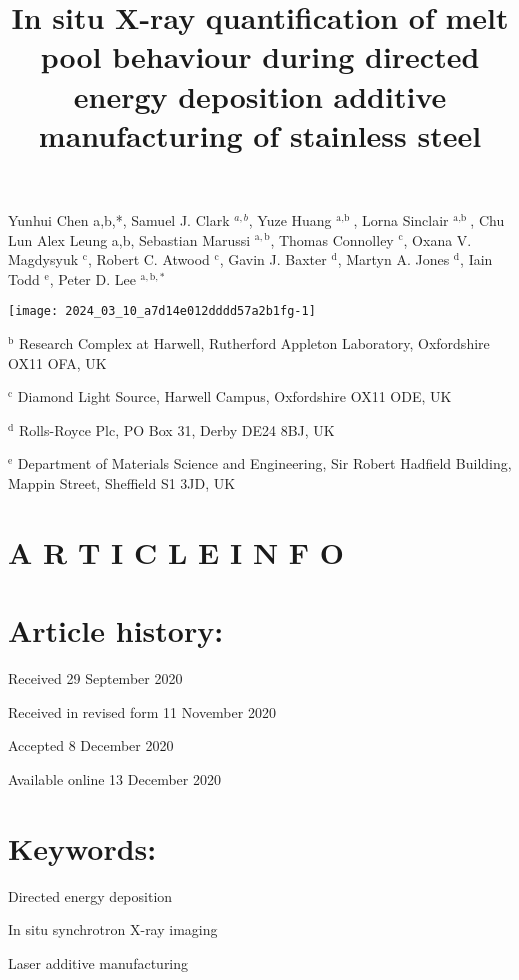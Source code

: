 \documentclass[10pt]{article}
\title{In situ X-ray quantification of melt pool behaviour during directed energy deposition additive manufacturing of stainless steel }
\author{}
\date{}
\begin{document}
\maketitle
Yunhui Chen a,b,*, Samuel J. Clark ${ }^{a, b}$, Yuze Huang ${ }^{\text {a,b }}$, Lorna Sinclair ${ }^{\text {a,b }}$, Chu Lun Alex Leung a,b, Sebastian Marussi ${ }^{\mathrm{a}, \mathrm{b}}$, Thomas Connolley ${ }^{\mathrm{c}}$, Oxana V. Magdysyuk ${ }^{\mathrm{c}}$, Robert C. Atwood ${ }^{\mathrm{c}}$, Gavin J. Baxter ${ }^{\mathrm{d}}$, Martyn A. Jones ${ }^{\mathrm{d}}$, Iain Todd ${ }^{\mathrm{e}}$, Peter D. Lee ${ }^{\mathrm{a}, \mathrm{b}, *}$

\begin{center}
\texttt{[image: 2024\_03\_10\_a7d14e012dddd57a2b1fg-1]}
\end{center}

${ }^{\mathrm{b}}$ Research Complex at Harwell, Rutherford Appleton Laboratory, Oxfordshire OX11 OFA, UK

${ }^{\mathrm{c}}$ Diamond Light Source, Harwell Campus, Oxfordshire OX11 ODE, UK

${ }^{\mathrm{d}}$ Rolls-Royce Plc, PO Box 31, Derby DE24 8BJ, UK

${ }^{\mathrm{e}}$ Department of Materials Science and Engineering, Sir Robert Hadfield Building, Mappin Street, Sheffield S1 3JD, UK

\section*{A R T I C L E I N F O}
\section*{Article history:}
Received 29 September 2020

Received in revised form 11 November 2020

Accepted 8 December 2020

Available online 13 December 2020

\section*{Keywords:}
Directed energy deposition

In situ synchrotron X-ray imaging

Laser additive manufacturing
\end{document}
